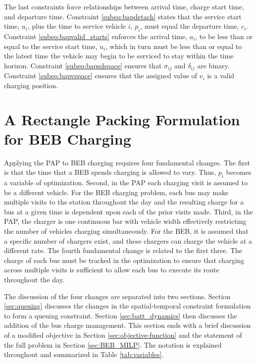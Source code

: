\documentclass[utf8]{FrontiersinHarvard}
\begin{document}
The last constraints force relationships between arrival time, charge start time, and departure time. Constraint
\eqref{subeq:bapdetach} states that the service start time, $u_i$, plus the time to service vehicle $i$, $p_i$, must
equal the departure time, $c_i$. Constraint \eqref{subeq:bapvalid_starts} enforces the arrival time, $a_i$, to be less
than or equal to the service start time, $u_i$, which in turn must be less than or equal to the latest time the vehicle
may begin to be serviced to stay within the time horizon. Constraint \eqref{subeq:bapsdspace} ensures that $\sigma_{ij}$ and
$\delta_{ij}$ are binary. Constraint \eqref{subeq:bapvspace} ensures that the assigned value of $v_i$ is a valid charging
position.

%
\section{A Rectangle Packing Formulation for BEB Charging}  \label{sec:problemformulation}
Applying the PAP to BEB charging requires four fundamental changes. The first is that the time that a BEB spends
charging is allowed to vary. Thus, $p_i$ becomes a variable of optimization. Second, in the PAP each charging visit is
assumed to be a different vehicle. For the BEB charging problem, each bus may make multiple visits to the station
throughout the day and the resulting charge for a bus at a given time is dependent upon each of the prior visits made.
Third, in the PAP, the charger is one continuous bar with vehicle width effectively restricting the number of vehicles
charging simultaneously. For the BEB, it is assumed that a specific number of chargers exist, and these chargers can
charge the vehicle at a different rate. The fourth fundamental change is related to the first three. The charge of each
bus must be tracked in the optimization to ensure that charging across multiple visits is sufficient to allow each bus
to execute its route throughout the day.

The discussion of the four changes are separated into two sections. Section \ref{sec:queuing} discusses the changes in
the spatial-temporal constraint formulation to form a queuing constraint. Section \ref{sec:batt_dynamics} then discusses
the addition of the bus charge management. This section ends with a brief discussion of a modified objective in Section
\ref{sec:objective-function} and the statement of the full problem in Section \ref{sec:BEB_MILP}. The notation is
explained throughout and summarized in Table \ref{tab:variables}.
\end{document}
